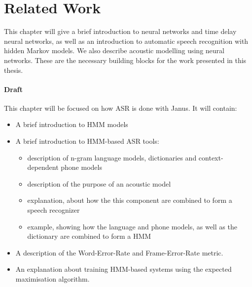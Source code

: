 
\chapter{Related Work}
\label{ch:realted_work}

This chapter will give a brief introduction to neural networks and time delay neural networks, as well as an introduction to  automatic speech recognition with hidden Markov models. We also describe acoustic modelling using neural networks. These are the necessary building blocks for the work presented in this thesis.






\iffalse
\subsubsection{Draft}

This chapter will be focused on how ASR is done with Janus. It will contain: 
\begin{itemize}
	\item A brief introduction to HMM models
	\item A brief introduction to HMM-based ASR tools:
	\begin{itemize}
		\item description of n-gram language models, dictionaries and context-dependent phone models
		\item description of the purpose of an acoustic model
		\item explanation, about how the this component are combined to form a speech recognizer 
		\item example, showing how the language and phone models, as well as the dictionary are combined to form a HMM
	\end{itemize}
	\item A description of the Word-Error-Rate and Frame-Error-Rate metric. 
	\item An explanation about training HMM-based systems using the expected maximisation algorithm. 
\end{itemize}

